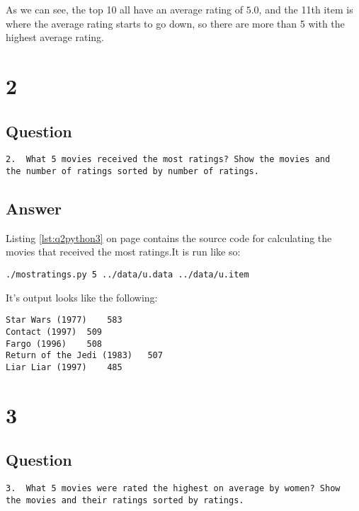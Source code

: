 \documentclass[letterpaper,11pt]{article}
\begin{document}
As we can see, the top 10 all have an average rating of $5.0$, and the 11th item is where the average rating starts to go down, so there are more than 5 with the highest average rating.

\newpage

\section*{2}

\subsection*{Question}

\begin{verbatim}
2.  What 5 movies received the most ratings? Show the movies and
the number of ratings sorted by number of ratings.
\end{verbatim}

\subsection*{Answer}

Listing \ref{lst:q2python3} on page \pageref{lst:q2python3} contains the source code for calculating the movies that received the most ratings.It is run like so:
\begin{lstlisting}[frame=single]
./mostratings.py 5 ../data/u.data ../data/u.item
\end{lstlisting}

It's output looks like the following:
\begin{lstlisting}[frame=single]
Star Wars (1977)	583
Contact (1997)	509
Fargo (1996)	508
Return of the Jedi (1983)	507
Liar Liar (1997)	485
\end{lstlisting}

\newpage

\section*{3}

\subsection*{Question}

\begin{verbatim}
3.  What 5 movies were rated the highest on average by women? Show
the movies and their ratings sorted by ratings.
\end{verbatim}
\end{document}
